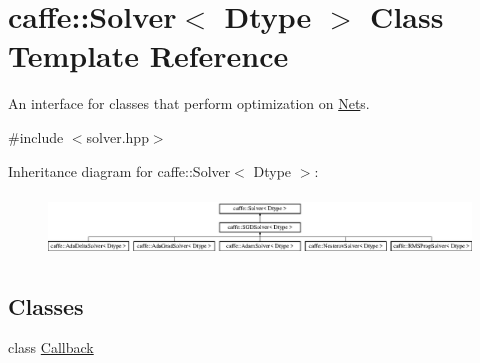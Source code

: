 \hypertarget{classcaffe_1_1Solver}{}\section{caffe\+:\+:Solver$<$ Dtype $>$ Class Template Reference}
\label{classcaffe_1_1Solver}


An interface for classes that perform optimization on \hyperlink{classcaffe_1_1Net}{Net}s.  




{\ttfamily \#include $<$solver.\+hpp$>$}

Inheritance diagram for caffe\+:\+:Solver$<$ Dtype $>$\+:\begin{figure}[H]
\begin{center}
\leavevmode
\includegraphics[height=1.655172cm]{classcaffe_1_1Solver}
\end{center}
\end{figure}
\subsection*{Classes}
\begin{DoxyCompactItemize}
\item 
class \hyperlink{classcaffe_1_1Solver_1_1Callback}{Callback}
\end{DoxyCompactItemize}
